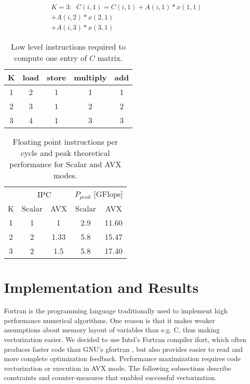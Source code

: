 \documentclass[journal, a4paper]{IEEEtran}
\begin{document}
      \begin{equation}      
	\begin{split}
	  K=3:\;\;C(i, 1) = C(i, 1) + A(i, 1) * x(1, 1) \\+ A(i, 2) * x(2, 1) \\+ A(i, 3) * x(3, 1)
	\end{split}
      \end{equation}
      
  \begin{table}[!hbt]
    \begin{center}
      \caption{Low level instructions required to compute one entry of $C$ matrix.}
      \label{tab:req}
      \begin{tabular}{c|c|c|c|c}
	K	& load & store & multiply & add \\
	\hline
	1	& 2 & 1 & 1 & 1 \\
	\hline
	2	& 3 & 1 & 2 & 2 \\
	\hline
	3	& 4 & 1 & 3 & 3
      \end{tabular}
    \end{center}
  \end{table}
 
  \begin{table}[!hbt]
    \begin{center}
      \caption{Floating point instructions per cycle and peak theoretical performance for Scalar and AVX modes.}
      \label{tab:perf}
      \begin{tabular}{c|c|c|c|c}
		& \multicolumn{2}{c}{IPC} & \multicolumn{2}{c}{$P_{peak}$ [GFlops]} \\
	K	& Scalar & AVX	& Scalar & AVX \\
	\hline
	1	& 1 & 1 & 2.9 & 11.60 \\
	\hline
	2	& 2 & 1.33 & 5.8 & 15.47 \\
	\hline
	3	& 2 & 1.5 & 5.8 & 17.40
      \end{tabular}
    \end{center}
  \end{table}


\section{Implementation and Results}

  Fortran is the programming language traditionally used to implement high performance numerical algorithms. One reason is that it makes weaker assumptions about memory layout of variables than e.g. C, thus making vectorization easier.  We decided to use Intel's Fortran compiler ifort, which often produces faster code than GNU's gfortran \cite{intel_comp}, but also provides easier to read and more complete optimization feedback. Performance maximization requires code vectorization or execution in AVX mode. The following subsections describe constraints and counter-measures that enabled successful vectorization.
  
\end{document}
